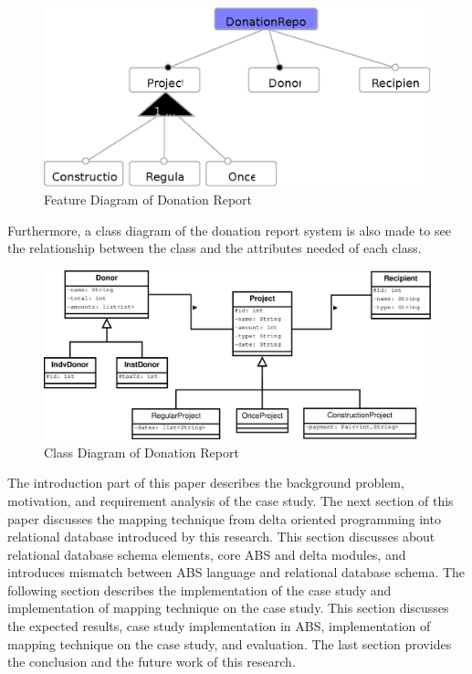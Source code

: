 \documentclass[runningheads,a4paper]{llncs}
\begin{document}
\begin{figure}
	\centering
	\includegraphics[scale=0.65]{FeatureDiagram.eps}
	\caption{Feature Diagram of Donation Report}
	\label{feature diagram}
\end{figure}

Furthermore, a class diagram of the donation report system is also made to see the relationship between the class and the attributes needed of each class. 

\begin{figure}
	\centering
	\includegraphics[scale=0.3]{ClassDiagram.eps}
	\caption{Class Diagram of Donation Report}
	\label{class diagram}
\end{figure}

The introduction part of this paper describes the background problem, motivation, and requirement analysis of the case study. The next section of this paper discusses the mapping technique from delta oriented programming into relational database introduced by this research. This section discusses about relational database schema elements, core ABS and delta modules, and introduces mismatch between ABS language and relational database schema. The following section describes the implementation of the case study and implementation of mapping technique on the case study. This section discusses the expected results, case study implementation in ABS, implementation of mapping technique on the case study, and evaluation. The last section provides the conclusion and the future work of this research.
\end{document}
